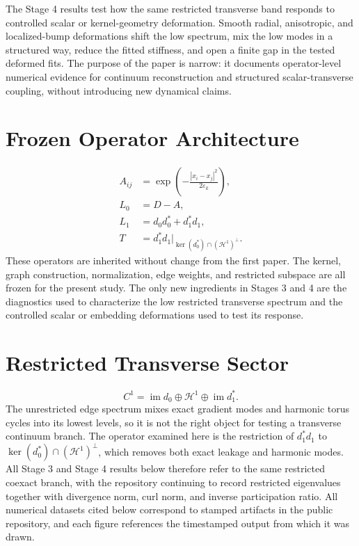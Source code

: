 \documentclass[11pt]{article}
\begin{document}
The Stage 4 results test how the same restricted transverse band responds to controlled scalar or kernel-geometry deformation. Smooth radial, anisotropic, and localized-bump deformations shift the low spectrum, mix the low modes in a structured way, reduce the fitted stiffness, and open a finite gap in the tested deformed fits. The purpose of the paper is narrow: it documents operator-level numerical evidence for continuum reconstruction and structured scalar-transverse coupling, without introducing new dynamical claims.

\section{Frozen Operator Architecture}
\begin{align}
A_{ij} &= \exp\!\left(-\frac{|x_i-x_j|^2}{2\varepsilon_k}\right),\\
L_0 &= D - A,\\
L_1 &= d_0 d_0^* + d_1^* d_1,\\
T &= d_1^* d_1\big|_{\ker(d_0^*) \cap (\mathcal{H}^1)^\perp}.
\end{align}
These operators are inherited without change from the first paper. The kernel, graph construction, normalization, edge weights, and restricted subspace are all frozen for the present study. The only new ingredients in Stages 3 and 4 are the diagnostics used to characterize the low restricted transverse spectrum and the controlled scalar or embedding deformations used to test its response.

\section{Restricted Transverse Sector}
\begin{equation}
C^1 = \operatorname{im} d_0 \oplus \mathcal{H}^1 \oplus \operatorname{im} d_1^*.
\end{equation}
The unrestricted edge spectrum mixes exact gradient modes and harmonic torus cycles into its lowest levels, so it is not the right object for testing a transverse continuum branch. The operator examined here is the restriction of $d_1^* d_1$ to $\ker(d_0^*) \cap (\mathcal{H}^1)^\perp$, which removes both exact leakage and harmonic modes. All Stage 3 and Stage 4 results below therefore refer to the same restricted coexact branch, with the repository continuing to record restricted eigenvalues together with divergence norm, curl norm, and inverse participation ratio.
All numerical datasets cited below correspond to stamped artifacts in the public repository, and each figure references the timestamped output from which it was drawn.
\end{document}
